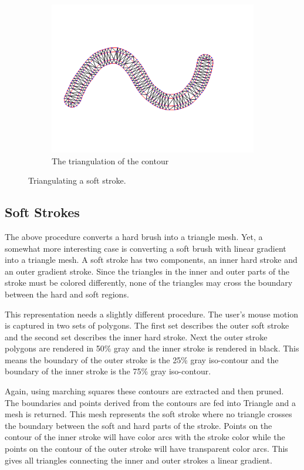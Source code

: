 \documentclass[conference]{acmsiggraph}
\begin{document}
\begin{figure}
\begin{subfigure}[b]{0.3\textwidth}
  \centering
  \includegraphics[width=.9\textwidth]{images/stroke_triangulation/softmesh}
  \caption{The triangulation of the contour}
  \label{fig:sub2}
\end{subfigure}
\caption{Triangulating a soft stroke.}
\label{fig:test}
\end{figure}



\subsection{Soft Strokes}
The above procedure converts a hard brush into a triangle mesh. Yet, a somewhat more interesting
case is converting a soft brush with linear gradient into a triangle mesh. A soft stroke has two
components, an inner hard stroke and an outer gradient stroke. Since the triangles in the inner and
outer parts of the stroke must be colored differently, none of the triangles may cross the boundary
between the hard and soft regions.

This representation needs a slightly different procedure. The user's mouse motion
is captured in two sets of polygons. The first set describes the outer soft stroke and the second set describes
the inner hard stroke. Next the outer stroke polygons are rendered in 50\% gray and the inner stroke
is rendered in black. This means the boundary of the outer stroke is the 25\% gray iso-contour and the
boundary of the inner stroke is the 75\% gray iso-contour.

Again, using marching squares these contours are extracted and then pruned. The boundaries and points
derived from the contours are fed into Triangle and a mesh is returned. This mesh represents the soft
stroke where no triangle crosses the boundary between the soft and hard parts
of the stroke. Points on the contour of the inner stroke will have color arcs with the stroke color
while the points on the contour of the outer stroke will have transparent color arcs. This gives
all triangles connecting the inner and outer strokes a linear gradient.
\end{document}
